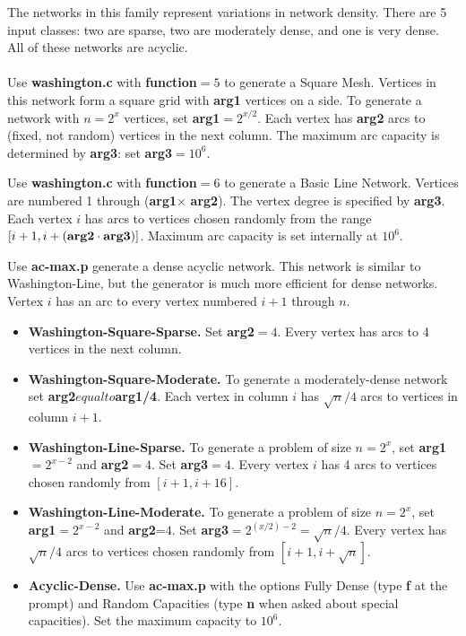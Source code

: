 The networks in this family represent variations in network density.
There are 5 input classes: two are sparse, two are moderately dense,
and one is very dense.  All of these networks are acyclic.

\paragraph{ } 
Use {\bf washington.c} with {\bf function}$=5$ to generate a Square
Mesh.  Vertices in this network form a square grid with {\bf arg1}
vertices on a side.  To generate a network with $n=2^x$ vertices, set
{\bf arg1}$=2^{x/2}$.  Each 
vertex has {\bf arg2} arcs to (fixed, not random) vertices in the next
column.  The maximum arc capacity is determined by {\bf arg3}: set
{\bf arg3}$=10^6$.

Use {\bf washington.c} with {\bf function}$=6$ to generate a Basic
Line Network.  Vertices are numbered 1 through ({\bf arg1}$\times${\bf
arg2}).  The vertex degree is specified by {\bf arg3}.  Each vertex
$i$ has arcs to vertices chosen randomly from the range $[i+1, i+({\bf
arg2}\cdot {\bf arg3})]$.  Maximum arc capacity is set internally at
$10^6$.

Use {\bf ac-max.p} generate a dense acyclic network.  This
network is similar to Washington-Line, but the generator is much more
efficient for dense networks.  Vertex $i$ has an arc to every vertex
numbered $i+1$ through $n$.

\begin{itemize} 
\item {\bf Washington-Square-Sparse.} 
Set {\bf arg2}$=4$.  Every vertex has arcs to 4 vertices in the next
column.

\item{\bf Washington-Square-Moderate.} To generate a moderately-dense 
network set {\bf arg2}$ equal to ${\bf arg1/4}.  Each vertex in 
column $i$ has $\sqrt{n}/4$ arcs to vertices in column $i+1$.

\item {\bf Washington-Line-Sparse.}  To generate a problem of size
$n = 2^x$, set {\bf arg1}$=2^{x-2}$ and {\bf arg2}$=4$.  Set {\bf
arg3}$=4$.  Every vertex $i$ has 4 arcs to vertices chosen randomly
from $[i+1, i+16]$.

\item {\bf Washington-Line-Moderate.}  To generate a problem of
size $n = 2^x$, set {\bf arg1}$=2^{x-2}$ and {\bf arg2}=$4$.  Set {\bf
arg3}$=2^{(x/2) - 2} = \sqrt{n}/4$.  Every vertex has $\sqrt{n}/4$
arcs to vertices chosen randomly from $[i+1, i+\sqrt{n}]$.

\item {\bf Acyclic-Dense.}  
Use {\bf ac-max.p} with the options Fully Dense (type {\bf f} at the
prompt) and Random Capacities (type {\bf n} when asked about special
capacities).  Set the maximum capacity to $10^6$.
\end{itemize}
 
